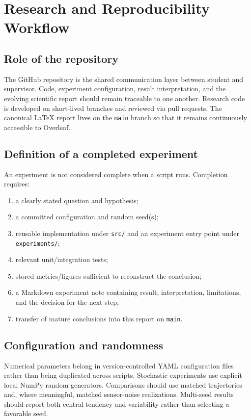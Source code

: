 \chapter{Research and Reproducibility Workflow}
\section{Role of the repository}
The GitHub repository is the shared communication layer between student and supervisor. Code, experiment configuration, result interpretation, and the evolving scientific report should remain traceable to one another. Research code is developed on short-lived branches and reviewed via pull requests. The canonical LaTeX report lives on the \texttt{main} branch so that it remains continuously accessible to Overleaf.

\section{Definition of a completed experiment}
An experiment is not considered complete when a script runs. Completion requires:
\begin{enumerate}
    \item a clearly stated question and hypothesis;
    \item a committed configuration and random seed(s);
    \item reusable implementation under \texttt{src/} and an experiment entry point under \texttt{experiments/};
    \item relevant unit/integration tests;
    \item stored metrics/figures sufficient to reconstruct the conclusion;
    \item a Markdown experiment note containing result, interpretation, limitations, and the decision for the next step;
    \item transfer of mature conclusions into this report on \texttt{main}.
\end{enumerate}

\section{Configuration and randomness}
Numerical parameters belong in version-controlled YAML configuration files rather than being duplicated across scripts. Stochastic experiments use explicit local NumPy random generators. Comparisons should use matched trajectories and, where meaningful, matched sensor-noise realizations. Multi-seed results should report both central tendency and variability rather than selecting a favorable seed.

